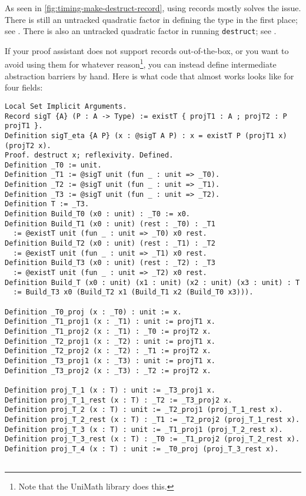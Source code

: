   As seen in \autoref{fig:timing-make-destruct-record}, using records mostly solves the issue.
  There is still an untracked quadratic factor in defining the type in the first place; see .
  There is also an untracked quadratic factor in running \texttt{destruct}; see .

  If your proof assistant does not support records out-of-the-box, or you want to avoid using them for whatever reason\footnote{Note that the UniMath library  does this. }, you can instead define intermediate abstraction barriers by hand.
  Here is what code that almost works looks like for four fields:
\begin{verbatim}
Local Set Implicit Arguments.
Record sigT {A} (P : A -> Type) := existT { projT1 : A ; projT2 : P projT1 }.
Definition sigT_eta {A P} (x : @sigT A P) : x = existT P (projT1 x) (projT2 x).
Proof. destruct x; reflexivity. Defined.
Definition _T0 := unit.
Definition _T1 := @sigT unit (fun _ : unit => _T0).
Definition _T2 := @sigT unit (fun _ : unit => _T1).
Definition _T3 := @sigT unit (fun _ : unit => _T2).
Definition T := _T3.
Definition Build_T0 (x0 : unit) : _T0 := x0.
Definition Build_T1 (x0 : unit) (rest : _T0) : _T1
  := @existT unit (fun _ : unit => _T0) x0 rest.
Definition Build_T2 (x0 : unit) (rest : _T1) : _T2
  := @existT unit (fun _ : unit => _T1) x0 rest.
Definition Build_T3 (x0 : unit) (rest : _T2) : _T3
  := @existT unit (fun _ : unit => _T2) x0 rest.
Definition Build_T (x0 : unit) (x1 : unit) (x2 : unit) (x3 : unit) : T
  := Build_T3 x0 (Build_T2 x1 (Build_T1 x2 (Build_T0 x3))).

Definition _T0_proj (x : _T0) : unit := x.
Definition _T1_proj1 (x : _T1) : unit := projT1 x.
Definition _T1_proj2 (x : _T1) : _T0 := projT2 x.
Definition _T2_proj1 (x : _T2) : unit := projT1 x.
Definition _T2_proj2 (x : _T2) : _T1 := projT2 x.
Definition _T3_proj1 (x : _T3) : unit := projT1 x.
Definition _T3_proj2 (x : _T3) : _T2 := projT2 x.

Definition proj_T_1 (x : T) : unit := _T3_proj1 x.
Definition proj_T_1_rest (x : T) : _T2 := _T3_proj2 x.
Definition proj_T_2 (x : T) : unit := _T2_proj1 (proj_T_1_rest x).
Definition proj_T_2_rest (x : T) : _T1 := _T2_proj2 (proj_T_1_rest x).
Definition proj_T_3 (x : T) : unit := _T1_proj1 (proj_T_2_rest x).
Definition proj_T_3_rest (x : T) : _T0 := _T1_proj2 (proj_T_2_rest x).
Definition proj_T_4 (x : T) : unit := _T0_proj (proj_T_3_rest x).


\end{verbatim}
